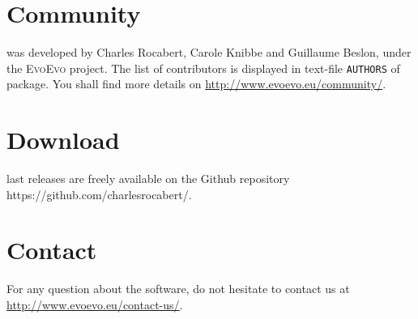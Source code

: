 \section{Community}
{\packageName} was developed by Charles Rocabert, Carole Knibbe and Guillaume Beslon, under the \textsc{EvoEvo} project. The list of contributors is displayed in text-file \texttt{AUTHORS} of {\packageName}  package.
You shall find more details on \href{http://www.evoevo.eu/community/}{http://www.evoevo.eu/community/}.

\section{Download}
{\packageName} last releases are freely available on the Github repository\\https://github.com/charlesrocabert/{\packageName}.

\section{Contact}
For any question about the software, do not hesitate to contact us at\\ \href{http://www.evoevo.eu/contact-us/}{http://www.evoevo.eu/contact-us/}.

\newpage
\thispagestyle{empty}


